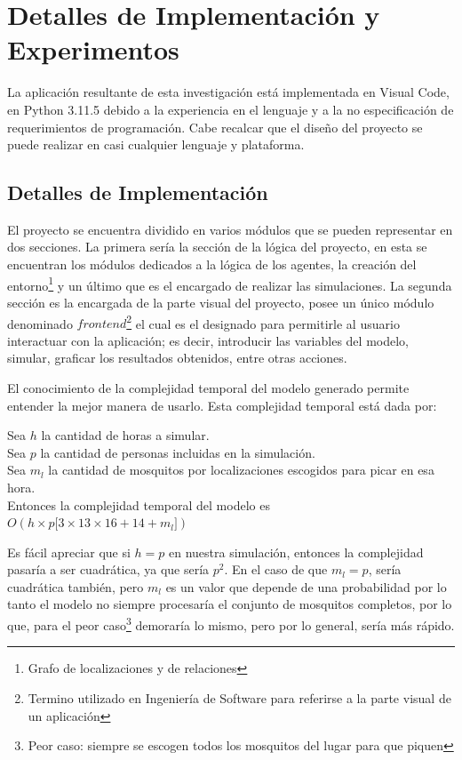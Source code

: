 \chapter{Detalles de Implementación y Experimentos}\label{chapter:implementation}
La aplicación resultante de esta investigación está implementada en Visual Code, en Python 3.11.5
debido a la experiencia en el lenguaje y a la no especificación de requerimientos de programación. Cabe 
recalcar que el diseño del proyecto se puede realizar en casi cualquier lenguaje y plataforma. \nocite{Aguilar2010}

\section{Detalles de Implementación}
El proyecto se encuentra dividido en varios módulos que se pueden representar en dos secciones.
La primera sería la sección de la lógica del proyecto, en esta se encuentran los módulos dedicados 
a la lógica de los agentes, la creación del entorno\footnote{Grafo de localizaciones y de relaciones}
y un último que es el encargado de realizar las simulaciones. La segunda sección es la encargada de 
la parte visual del proyecto, posee un único módulo denominado $frontend$\footnote{Termino utilizado en 
Ingeniería de Software para referirse a la parte visual de un aplicación} el cual es el designado para permitirle
al usuario interactuar con la aplicación; es decir, introducir las variables del modelo, simular, 
graficar los resultados obtenidos, entre otras acciones.

El conocimiento de la complejidad temporal del modelo generado permite entender la mejor manera de usarlo.
Esta complejidad temporal está dada por:
\begin{center}
    Sea $h$ la cantidad de horas a simular.\\
    Sea $p$ la cantidad de personas incluidas en la simulación.\\
    Sea $m_l$ la cantidad de mosquitos por localizaciones escogidos para picar en esa hora.\\
    Entonces la complejidad temporal del modelo es $O(h \times p \lbrack 3 \times 13 \times 16 + 14 + m_l \rbrack)$
\end{center}

Es fácil apreciar que si $h = p$ en nuestra simulación, entonces la complejidad pasaría a ser cuadrática, ya 
que sería $p^2$. En el caso de que $m_l = p$, sería cuadrática también, pero $m_l$ es un valor 
que depende de una probabilidad por lo tanto el modelo no siempre procesaría el conjunto de mosquitos completos,
por lo que, para el peor caso\footnote{Peor caso: siempre se escogen todos los mosquitos del lugar para que piquen} demoraría
lo mismo, pero por lo general, sería más rápido.



